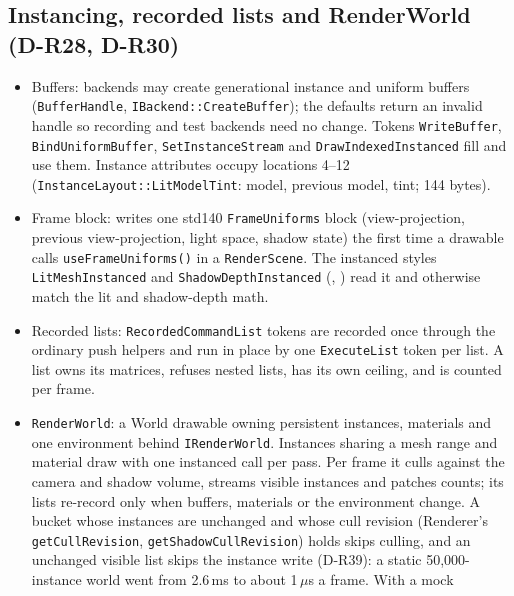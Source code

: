 \subsection{Instancing, recorded lists and RenderWorld (D-R28, D-R30)}
\begin{itemize}
  \item Buffers: backends may create generational instance and uniform
        buffers (\texttt{BufferHandle}, \texttt{IBackend::CreateBuffer}); the
        defaults return an invalid handle so recording and test backends need
        no change. Tokens \texttt{WriteBuffer}, \texttt{BindUniformBuffer},
        \texttt{SetInstanceStream} and \texttt{DrawIndexedInstanced} fill and
        use them. Instance attributes occupy locations 4--12
        (\texttt{InstanceLayout::LitModelTint}: model, previous model, tint;
        144 bytes).
  \item Frame block:  writes one std140
        \texttt{FrameUniforms} block (view-projection, previous
        view-projection, light space, shadow state) the first time a drawable
        calls \texttt{useFrameUniforms()} in a \texttt{RenderScene}. The
        instanced styles \texttt{LitMeshInstanced} and
        \texttt{ShadowDepthInstanced} (,
        ) read it and
        otherwise match the lit and shadow-depth math.
  \item Recorded lists: \texttt{RecordedCommandList} tokens are recorded once
        through the ordinary push helpers and run in place by one
        \texttt{ExecuteList} token per list. A list owns its matrices, refuses
        nested lists, has its own ceiling, and is counted per frame.
  \item \texttt{RenderWorld}: a World drawable owning persistent instances,
        materials and one environment behind \texttt{IRenderWorld}. Instances
        sharing a mesh range and material draw with one instanced call per
        pass. Per frame it culls against the camera and shadow volume,
        streams visible instances and patches counts; its lists re-record only
        when buffers, materials or the environment change. A bucket whose
        instances are unchanged and whose cull revision (Renderer's
        \texttt{getCullRevision}, \texttt{getShadowCullRevision}) holds skips
        culling, and an unchanged visible list skips the instance write
        (D-R39): a static 50,000-instance world went from 2.6\,ms to about
        1\,$\mu$s a frame. With a mock

\end{itemize}
